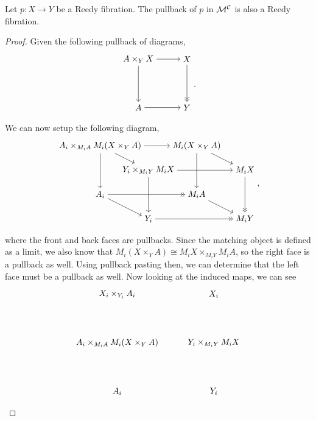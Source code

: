 \documentclass{amsart}
\begin{document}
\begin{prop}\label{prop:pb's of fibs}
    Let $p:X\to Y$ be a Reedy fibration. The pullback of $p$ in $\mathcal{M}^{\mathcal{C}}$ is also a Reedy fibration.
\end{prop}
\begin{proof}
    Given the following pullback of diagrams,
    \[\begin{matrix}\begin{tikzpicture}
        \node (A) at (0,0) {$A\times_YX$};
        \node (X) at (2,0) {$X$};
        \node (B) at (0,-2) {$A$};
        \node (Y) at (2,-2) {$Y$};
        \draw[->] (A) to (B);
        \draw[->] (A) to (X);
        \draw[->>] (X) to (Y);
        \draw[->] (B) to (Y);
    \end{tikzpicture}\end{matrix}.\]
    We can now setup the following diagram,
    \[\begin{matrix}\begin{tikzpicture}
        \node (SX) at (-1,0) {$A_i\times_{M_iA}M_i(X\times_{Y}A)$};
        \node (SY) at (3,0) {$M_i(X\times_{Y}A)$};
        \node (X) at (-1,-2) {$A_i$};
        \node (Y) at (3,-2) {$M_iA$};
        \node (SA) at (1,-1) {$Y_i\times_{M_iY}M_iX$};
        \node (SB) at (5,-1) {$M_iX$};
        \node (A) at (1,-3) {$Y_i$};
        \node (B) at (5,-3) {$M_iY$};
        \draw[->] (X) to (A);
        \draw[->>] (X) to (Y);
        \draw[->>] (A) to (B);
        \draw[->] (Y) to (B);
        \draw[->] (SX) to (SA);
        \draw[->] (SX) to (SY);
        \draw[->] (SA) to (SB);
        \draw[->] (SY) to (SB);
        \draw[->] (SX) to (X);
        \draw[->] (SY) to (Y);
        \draw[->] (SA) to (A);
        \draw[->>] (SB) to (B);
    \end{tikzpicture}\end{matrix},\]
    where the front and back faces are pullbacks. Since the matching object is defined as a limit, we also know that $M_i(X\times_Y A)\cong M_iX\times_{M_iY}M_iA$, so the right face is a pullback as well. Using pullback pasting then, we can determine that the left face must be a pullback as well. Now looking at the induced maps, we can see
    \[\begin{matrix}\begin{tikzpicture}
        \node (XA) at (-2,0) {$X_i\times_{Y_i}A_i$};
        \node (X) at (2,0) {$X_i$};
        \node (AMXA) at (-2,-2) {$A_i\times_{M_iA}M_i(X\times_{Y}A)$};
        \node (YMX) at (2,-2) {$Y_i\times_{M_iY}M_iX$};
        \node (A) at (-2,-4) {$A_i$};
        \node (Y) at (2,-4) {$Y_i$};

\end{tikzpicture}
\end{matrix}\]
\end{proof}
\end{document}
